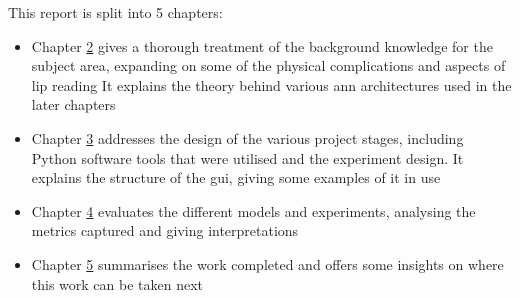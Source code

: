 This report is split into 5 chapters:
\begin{itemize}
  \item Chapter \hyperref[cha:background]{2} gives a thorough treatment of the background knowledge for the subject area, expanding on some of the physical complications and aspects of lip reading It explains the theory behind various \acrfull{ann} architectures used in the later chapters
  \item Chapter \hyperref[cha:design]{3} addresses the design of the various project stages, including Python software tools that were utilised and the experiment design. It explains the structure of the \acrlong{gui}, giving some examples of it in use
  \item Chapter \hyperref[cha:results]{4} evaluates the different models and experiments, analysing the metrics captured and giving interpretations
  \item Chapter \hyperref[cha:conclusion]{5} summarises the work completed and offers some insights on where this work can be taken next
\end{itemize}